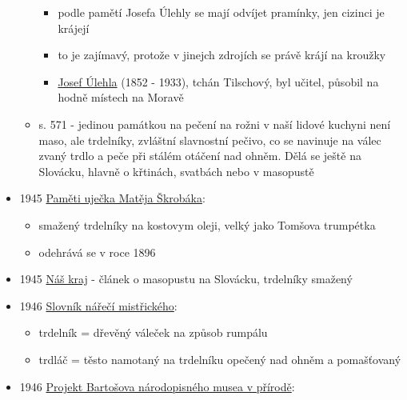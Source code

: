 \begin{itemize}
\begin{itemize}
    \begin{itemize}
    \tightlist
    \item
      podle pamětí Josefa Úlehly se mají odvíjet pramínky, jen cizinci
      je krájejí
    \item
      to je zajímavý, protože v jinejch zdrojích se právě krájí na
      kroužky
    \item
      \href{https://encyklopedie.brna.cz/home-mmb/?acc=profil-osobnosti&load=3473}{Josef
      Úlehla} (1852 - 1933), tchán Tilschový, byl učitel, působil na
      hodně místech na Moravě
    \end{itemize}
  \item
    s. 571 - jedinou památkou na pečení na rožni v naší lidové kuchyni
    není maso, ale trdelníky, zvláštní slavnostní pečivo, co se navinuje
    na válec zvaný trdlo a peče při stálém otáčení nad ohněm. Dělá se
    ještě na Slovácku, hlavně o křtinách, svatbách nebo v masopustě
  \end{itemize}
\item
  1945
  \href{https://ceskadigitalniknihovna.cz/view/uuid:a0628fa0-c266-11ed-9eb6-005056827e52?page=uuid\%3Ac795fb09-57f5-4221-8dc6-28537310e770&fulltext=trdeln\%C3\%ADk\%20OR\%20trdeln\%C3\%ADky\%20OR\%20trdeln\%C3\%ADk\%C5\%AF&source=mzk}{Paměti
  uječka Matěja Škrobáka}:

  \begin{itemize}
  \tightlist
  \item
    smažený trdelníky na kostovym oleji, velký jako Tomšova trumpétka
  \item
    odehrává se v roce 1896
  \end{itemize}
\item
  1945
  \href{https://ceskadigitalniknihovna.cz/view/uuid:418433d0-7277-11dc-b60a-000d606f5dc6?page=uuid\%3Ad7f9cd6a-a3fe-4479-9f34-63429f6ac6d1&fulltext=trdeln\%C3\%ADk\%20OR\%20trdeln\%C3\%ADky\%20OR\%20trdeln\%C3\%ADk\%C5\%AF&source=nkp}{Náš
  kraj} - článek o masopustu na Slovácku, trdelníky smažený
\item
  1946
  \href{https://ceskadigitalniknihovna.cz/view/uuid:e0e42f00-3284-11e4-8f64-005056827e52?page=uuid\%3A6ed8c580-46e6-11e4-a450-5ef3fc9bb22f&fulltext=trdeln\%C3\%ADk\%20OR\%20trdeln\%C3\%ADky\%20OR\%20trdeln\%C3\%ADk\%C5\%AF&source=nkp}{Slovník
  nářečí mistřického}:

  \begin{itemize}
  \tightlist
  \item
    trdelník = dřevěný váleček na způsob rumpálu
  \item
    trdláč = těsto namotaný na trdelníku opečený nad ohněm a pomašťovaný
  \end{itemize}
\item
  1946
  \href{https://ceskadigitalniknihovna.cz/uuid/uuid:c22c5a5d-8140-11ed-b210-001b63bd97ba}{Projekt
  Bartošova národopisného musea v přírodě}:


\end{itemize}
